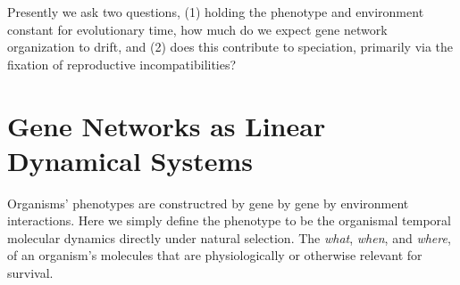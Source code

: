 \documentclass[9 pt]{article}
\newcommand{\1}{\mathbbm{1}}
\begin{document}
  Presently we ask two questions, (1) holding the phenotype and environment constant for evolutionary time, how much do we expect gene network organization to drift, and (2) does this contribute to speciation, primarily via the fixation of reproductive incompatibilities?

\section*{Gene Networks as Linear Dynamical Systems}

  Organisms' phenotypes are constructred by gene by gene by environment interactions. Here we simply define the phenotype to be the organismal temporal molecular dynamics directly under natural selection. The \emph{what}, \emph{when}, and \emph{where}, of an organism's molecules that are physiologically or otherwise relevant for survival. 
\end{document}
